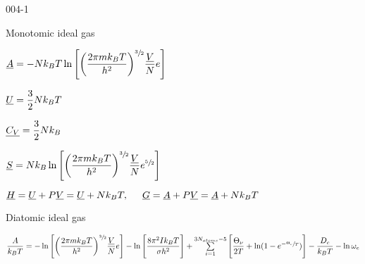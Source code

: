 \begin{mitframe}{004-1} %

    
	\begin{listone}
        
    	\item Monotomic ideal gas 
    
    	\item $\uline{\helmholtz} = -\nummoles\boltz\Temp\ln\Bigg[\bigg(\dfrac{2\pie\mass\boltz\Temp}{\planck^{2}}\bigg)^{\sfrac{3}{2}}\dfrac{\uline{\vol}}{\nummoles}\e\Bigg]$
    
    
    	\item $\uline{\intenergy}=\dfrac{3}{2}\nummoles\boltz\Temp$
    
    	\item $\uline{\cv}=\dfrac{3}{2}\nummoles\boltz$
    
    
    	\item $\uline{\entropy}=\nummoles\boltz\ln\Bigg[\bigg(\dfrac{2\pie\mass\boltz\Temp}{\planck^{2}}\bigg)^{\sfrac{3}{2}}\dfrac{\uline{\vol}}{\nummoles}\e^{\sfrac{5}{2}}\Bigg]$
    
    
    \item $\uline{\enthalpy}=\uline{\intenergy}+\p\uline{\vol}=\uline{\intenergy}+\nummoles\boltz\Temp,\tab \uline{\gibbs}=\uline{\helmholtz}+\p\uline{\vol}=\uline{\helmholtz}+\nummoles\boltz\Temp$
    
    
    \item Diatomic ideal gas 
   
   	\item $\dfrac{\helmholtz}{\boltz\Temp}=-\ln\Bigg[\bigg(\dfrac{2\pie\mass\boltz\Temp}{\planck^{2}}\bigg)^{\sfrac{3}{2}}\dfrac{\uline{\vol}}{\nummoles}\e\Bigg]-\ln\Bigg[\dfrac{8\pie^{2}\mominertia\boltz\Temp}{\molecrad\planck^{2}}\Bigg]+\sum\limits_{i=1}^{3\nummoles_{atoms}-5}\Bigg[\dfrac{\vibrfreqfac}{2\Temp}+\ln(1-\e^{-\sfrac{\vibrfreqfac}{\Temp}})\Bigg]-\dfrac{\eneatom}{\boltz\Temp}-\ln\elecdegen$
    

\end{listone}
\end{mitframe}
